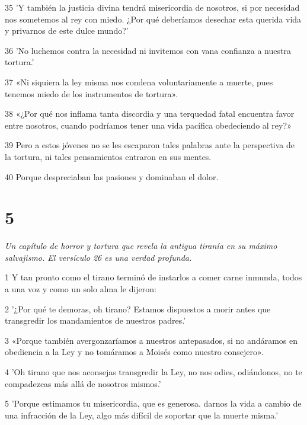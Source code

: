 \par 35 'Y también la justicia divina tendrá misericordia de nosotros, si por necesidad nos sometemos al rey con miedo. ¿Por qué deberíamos desechar esta querida vida y privarnos de este dulce mundo?'

\par 36 'No luchemos contra la necesidad ni invitemos con vana confianza a nuestra tortura.'

\par 37 «Ni siquiera la ley misma nos condena voluntariamente a muerte, pues tenemos miedo de los instrumentos de tortura».

\par 38 «¿Por qué nos inflama tanta discordia y una terquedad fatal encuentra favor entre nosotros, cuando podríamos tener una vida pacífica obedeciendo al rey?»

\par 39 Pero a estos jóvenes no se les escaparon tales palabras ante la perspectiva de la tortura, ni tales pensamientos entraron en sus mentes.

\par 40 Porque despreciaban las pasiones y dominaban el dolor.

\chapter{5}

\par \textit{Un capítulo de horror y tortura que revela la antigua tiranía en su máximo salvajismo. El versículo 26 es una verdad profunda.}

\par 1 Y tan pronto como el tirano terminó de instarlos a comer carne inmunda, todos a una voz y como un solo alma le dijeron:

\par 2 '¿Por qué te demoras, oh tirano? Estamos dispuestos a morir antes que transgredir los mandamientos de nuestros padres.'

\par 3 «Porque también avergonzaríamos a nuestros antepasados, si no andáramos en obediencia a la Ley y no tomáramos a Moisés como nuestro consejero».

\par 4 'Oh tirano que nos aconsejas transgredir la Ley, no nos odies, odiándonos, no te compadezcas más allá de nosotros mismos.'

\par 5 'Porque estimamos tu misericordia, que es generosa. darnos la vida a cambio de una infracción de la Ley, algo más difícil de soportar que la muerte misma.'

